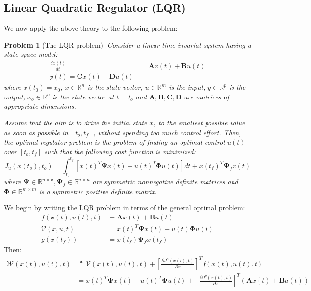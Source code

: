 \documentclass{book}
\newtheorem{problem}{Problem}
\begin{document}
\subsection{Linear Quadratic Regulator (LQR)}
We now apply the above theory to the following problem:
\begin{problem}[The LQR problem]
	Consider a linear time invariat system having a state space model:
	\begin{align}
			\frac{d x (t)}{dt}  &= \bm{A} x (t) + \bm{B}u (t) \\
			y (t) = \bm{C} x (t) + \bm{D}u (t)
	\end{align}
	where $ x (t_{ 0 })= x_{ 0 }  $,
	$ x \in \mathbb{R}^{ n }  $ is the state vector,
	$ u \in \mathbb{R}^{ m }   $ is the input,
	$ y \in \mathbb{R}^{ p }  $ is the output, 
	$ x_{ o } \in \mathbb{R}^{ n }  $ is the state vector at $ t = t_{ o }  $
	and $ \bm{A}, \bm{B}, \bm{C},\bm{D}  $ are matrices of appropriate dimensions.

	Assume that the aim is to drive the initial state $ x_{ o }  $ to the smallest
	possible value as soon as possible in $ \left[ t_{ o }, t_{ f } \right]   $,
	without spending too much control effort.
	Then, the optimal regulator problem is the problem of finding an optimal control
	$ u (t)  $ over $ \left[ t_{ o }, t_{ f } \right]    $ such that the following cost function
	is minimized:
	\begin{equation}
	J_{ u } (x (t_{ o }), t_{ o }) = 
	\int_{t_{ o }}^{t_{ f }} \left[ 
x (t)^{ T } \bm{\Psi} x (t) + u (t)^{ T } \bm{\Phi} u (t)
	\right]  dt
	+ x (t_{ f })^{ T } \bm{\Psi}_{ f } x (t)
	\end{equation}
	where $ \bm{\Psi} \in \mathbb{R}^{ n \times n }, \bm{\Psi}_{ f } \in \mathbb{R}^{ n \times n }  $
	are symmetric nonnegative definite matrices and 
	$ \bm{\Phi} \in \mathbb{R}^{m \times  m}   $ is a symmetric positive definite matrix.
\end{problem}
We begin by writing the LQR problem in terms of the general optimal problem:
\begin{align}
		f (x (t), u (t), t) &= \bm{A} x (t) + \bm{B} u (t) \\
		\mathcal{V} (x,u,t) &= x (t)^{ T } \bm{\Psi} x (t) + u (t) \bm{\Phi} u (t)\\
		g (x (t_{ f })) &= x (t_{ f }) \bm{\Psi}_{ f } x (t_{ f })
\end{align}
Then:
\begin{align}
		\mathcal{W} (x (t), u (t), t) &\triangleq 
		\mathcal{V} (x (t), u (t), t) + 
		\left[ \frac{\partial J^{ o } (x (t), t)}{\partial x}  \right] ^{ T }
		f (x (t), u (t), t) \\
									  &=
x (t)^{ T } \bm{\Psi} x (t) + u (t)^{ T } \bm{\Phi} u (t) + 
\left[ \frac{\partial J^{ o } (x (t), t)}{\partial x}  \right]^{ T }
\left( \bm{A}x (t) + \bm{B}u (t) \right) 
\end{align}
\end{document}
